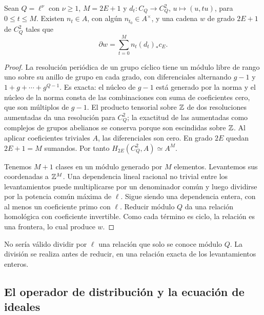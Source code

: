 \begin{lema}
\label{lem:rh-relacion}
Sean $Q=\ell^\nu$ con $\nu\ge1$, $M=2E+1$ y $d_t:C_Q\to C_Q^2$, $u\mapsto(u,tu)$, para $0\le t\le M$. Existen $n_t\in A$, con algún $n_{t_0}\in A^\times$, y una cadena $w$ de grado $2E+1$ de $C_Q^2$ tales que
\begin{equation}
 \partial w=\sum_{t=0}^{M} n_t(d_t)_*c_E.
 \label{eq:rh-relacion}
\end{equation}
\end{lema}
\begin{proof}
La resolución periódica de un grupo cíclico tiene un módulo libre de rango uno sobre su anillo de grupo en cada grado, con diferenciales alternando $g-1$ y $1+g+\cdots+g^{Q-1}$. Es exacta: el núcleo de $g-1$ está generado por la norma y el núcleo de la norma consta de las combinaciones con suma de coeficientes cero, que son múltiplos de $g-1$. El producto tensorial sobre $\mathbb{Z}$ de dos resoluciones aumentadas da una resolución para $C_Q^2$; la exactitud de las aumentadas como complejos de grupos abelianos se conserva porque son escindidas sobre $\mathbb{Z}$. Al aplicar coeficientes triviales $A$, las diferenciales son cero. En grado $2E$ quedan $2E+1=M$ sumandos. Por tanto $H_{2E}(C_Q^2,A)\simeq A^M$.

Tenemos $M+1$ clases en un módulo generado por $M$ elementos. Levantemos sus coordenadas a $\mathbb{Z}^M$. Una dependencia lineal racional no trivial entre los levantamientos puede multiplicarse por un denominador común y luego dividirse por la potencia común máxima de $\ell$. Sigue siendo una dependencia entera, con al menos un coeficiente primo con $\ell$. Reducir módulo $Q$ da una relación homológica con coeficiente invertible. Como cada término es ciclo, la relación es una frontera, lo cual produce $w$.
\end{proof}

No sería válido dividir por $\ell$ una relación que solo se conoce módulo $Q$. La división se realiza antes de reducir, en una relación exacta de los levantamientos enteros.

\subsection{El operador de distribución y la ecuación de ideales}


